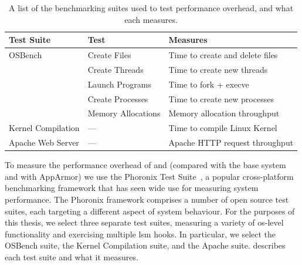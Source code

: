 \begin{table}[htp]
  \centering
  \footnotesize
  \caption[List of benchmarking suites and what they measure]{
    A list of the benchmarking suites used to test performance overhead, and what each
    measures.
  }%
  \label{tab:suites}
  \begin{tabular}{lll}
  \toprule
  Test Suite & Test & Measures \\
  \midrule
  OSBench                    & Create Files       & Time to create and delete files \\
                             & Create Threads     & Time to create new threads \\
                             & Launch Programs    & Time to fork + execve \\
                             & Create Processes   & Time to create new processes \\
                             & Memory Allocations & Memory allocation throughput \\
  Kernel Compilation         & ---                & Time to compile Linux Kernel \\
  Apache Web Server          & ---                & Apache HTTP request throughput \\
  \bottomrule
  \end{tabular}
\end{table}

To measure the performance overhead of \bpfbox{} and \bpfcontain{} (compared with the base
system and with AppArmor) we use the Phoronix Test Suite~\cite{phoronix}, a popular
cross-platform benchmarking framework that has seen wide use for measuring system
performance. The Phoronix framework comprises a number of open source test suites, each
targeting a different aspect of system behaviour. For the purposes of this thesis, we
select three separate test suites, measuring a variety of \gls{os}-level functionality and
exercising multiple \gls{lsm} hooks. In particular, we select the OSBench suite, the
Kernel Compilation suite, and the Apache suite.  describes each test
suite and what it measures.

